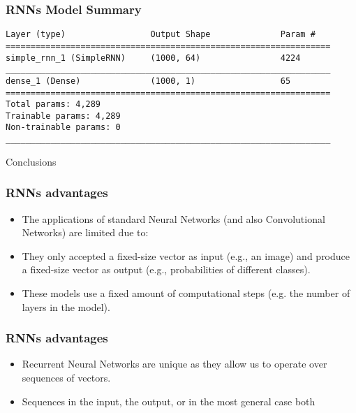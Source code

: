 \begin{frame}[fragile] \frametitle{RNNs Model Summary}
\begin{lstlisting}
Layer (type)                 Output Shape              Param #   
=================================================================
simple_rnn_1 (SimpleRNN)     (1000, 64)                4224      
_________________________________________________________________
dense_1 (Dense)              (1000, 1)                 65        
=================================================================
Total params: 4,289
Trainable params: 4,289
Non-trainable params: 0
_________________________________________________________________
\end{lstlisting}




\end{frame}





\begin{frame}
  \begin{center}
    {\Large Conclusions}
  \end{center}
\end{frame}


\begin{frame}[fragile] \frametitle{RNNs advantages}

\begin{itemize}
\item The applications of standard Neural Networks (and also Convolutional Networks) are limited due to:
\item They only accepted a fixed-size vector as input (e.g., an image) and produce a fixed-size vector as output (e.g., probabilities of different classes). 
\item These models use a fixed amount of computational steps (e.g. the number of layers in the model).
\end{itemize}
\end{frame}


\begin{frame}[fragile] \frametitle{RNNs advantages}

\begin{itemize}
\item Recurrent Neural Networks are unique as they allow us to operate over sequences of vectors.
\item Sequences in the input, the output, or in the most general case both
\end{itemize}
\end{frame}


